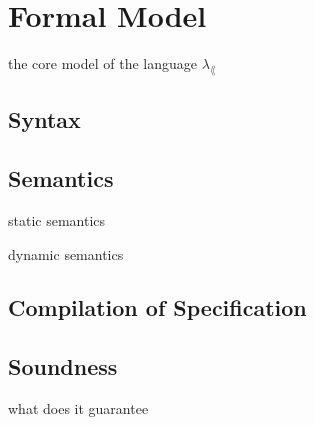 \section{Formal Model}
\label{sec:model}

the core model of the language $\lambda_\lang$

\subsection{Syntax}



\subsection{Semantics}

static semantics

dynamic semantics

\subsection{Compilation of Specification}

\subsection{Soundness}

what does it guarantee

